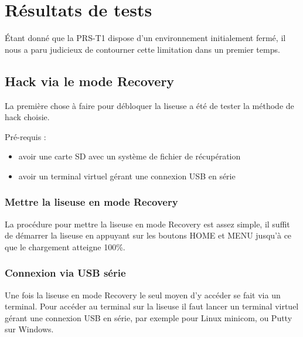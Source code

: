 \chapter{Résultats de tests}

Étant donné que la PRS-T1 dispose d'un environnement initialement fermé, il nous a paru judicieux de contourner cette limitation dans un premier temps.

\section{Hack via le mode Recovery}

La première chose à faire pour débloquer la liseuse a été de tester la méthode de hack choisie.

Pré-requis : 
\begin{itemize}
	\item avoir une carte SD avec un système de fichier de récupération 
	\item avoir un terminal virtuel gérant une connexion USB en série
\end{itemize}

\subsection{Mettre la liseuse en mode Recovery}

La procédure pour mettre la liseuse en mode Recovery est assez simple, il suffit de démarrer la liseuse en appuyant sur les boutons HOME et MENU jusqu'à ce que le chargement atteigne 100\%. 

\subsection{Connexion via USB série}

Une fois la liseuse en mode Recovery le seul moyen d'y accéder se fait via un terminal.
Pour accéder au terminal sur la liseuse il faut lancer un terminal virtuel gérant une connexion USB en série, par exemple pour Linux minicom, ou Putty sur Windows.

